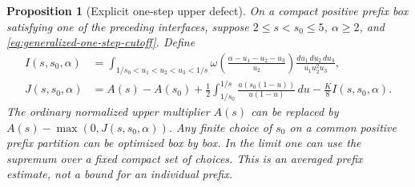 \documentclass[11pt]{article}
\newtheorem{proposition}[theorem]{Proposition}
\begin{document}
\begin{proposition}[Explicit one-step upper defect]
\label{prop:generalized-one-step-defect}
On a compact positive prefix box satisfying one of the preceding
interfaces, suppose $2\le s<s_0\le5$, $\alpha\ge2$, and
\eqref{eq:generalized-one-step-cutoff}. Define
\begin{align}
 I(s,s_0,\alpha)
 &=\int_{1/s_0<u_1<u_2<u_3<1/s}
 \omega\!\left(\frac{\alpha-u_1-u_2-u_3}{u_2}\right)
                  \frac{du_1\,du_2\,du_3}{u_1u_2^2u_3},\label{eq:generalized-one-step-I}\\
 J(s,s_0,\alpha)
 &=A(s)-A(s_0)+\frac12\int_{1/s_0}^{1/s}
       \frac{a(s_0(1-u))}{u(1-u)}\,du
                   -\frac K8 I(s,s_0,\alpha).
                   \label{eq:generalized-one-step-J}
\end{align}
The ordinary normalized upper multiplier $A(s)$ can be replaced by
$A(s)-\max(0,J(s,s_0,\alpha))$. Any finite choice of $s_0$ on a common
positive prefix partition can be optimized box by box. In the limit
one can use the supremum over a fixed compact set of choices. This is
an averaged prefix estimate, not a bound for an individual prefix.
\end{proposition}
\end{document}
